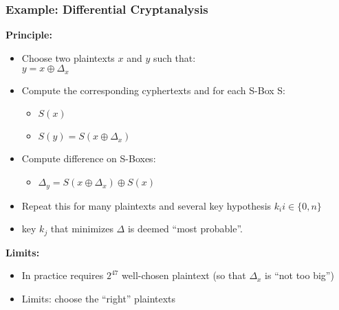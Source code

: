 \documentclass[
hyperref={pdfpagelabels=false}
,xcolor=table
]
{beamer}
\newcommand{\minus}{{\texttt{[image: minus.png]}}}
\begin{document}
\begin{frame}
  \frametitle{Example: Differential Cryptanalysis}
  
  \textbf{Principle:}
  \begin{itemize}
  \item Choose two plaintexts $x$ and $y$ such that: \\
    $y = x \oplus \Delta_x$
  \item Compute the corresponding cyphertexts and for each S-Box S: 
    \begin{itemize}
    \item $S(x)$
    \item $S(y) = S(x \oplus \Delta_x)$
    \end{itemize}
  \item Compute difference on S-Boxes:
    \begin{itemize}
    \item $\Delta_y = S(x \oplus \Delta_x) \oplus S(x)$
    \end{itemize}
  \item Repeat this for many plaintexts and several key hypothesis $k_i i \in \{0, n\}$
  \item key $k_j$ that minimizes $\Delta$ is deemed ``most probable''.
  \end{itemize}

  \textbf{Limits: }
  \begin{itemize}
  \item[\minus] In practice requires $2^{47}$ well-chosen plaintext (so that $\Delta_x$ is ``not too big'')
  \item[\minus] Limits: choose the ``right'' plaintexts
  \end{itemize}
\end{frame}



\end{document}
